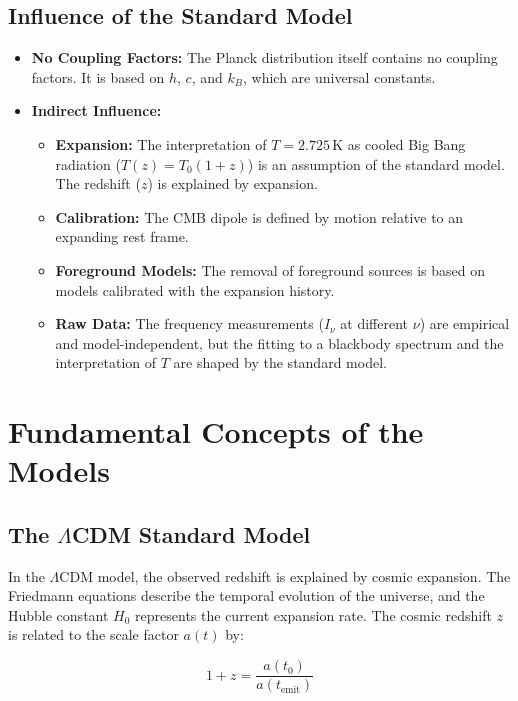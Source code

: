 \documentclass[a4paper,12pt]{article}
\theoremstyle{definition}
\theoremstyle{remark}
\begin{document}
	\subsection{Influence of the Standard Model}
	
	\begin{itemize}
		\item \textbf{No Coupling Factors:} The Planck distribution itself contains no coupling factors. It is based on $h$, $c$, and $k_B$, which are universal constants.
		\item \textbf{Indirect Influence:}
		\begin{itemize}
			\item \textbf{Expansion:} The interpretation of $T = 2.725 \, \text{K}$ as cooled Big Bang radiation ($T(z) = T_0 (1 + z)$) is an assumption of the standard model. The redshift ($z$) is explained by expansion.
			\item \textbf{Calibration:} The CMB dipole is defined by motion relative to an expanding rest frame.
			\item \textbf{Foreground Models:} The removal of foreground sources is based on models calibrated with the expansion history.
			\item \textbf{Raw Data:} The frequency measurements ($I_\nu$ at different $\nu$) are empirical and model-independent, but the fitting to a blackbody spectrum and the interpretation of $T$ are shaped by the standard model.
		\end{itemize}
	\end{itemize}
	
	\section{Fundamental Concepts of the Models}
	
	\subsection{The $\Lambda$CDM Standard Model}
	
	In the $\Lambda$CDM model, the observed redshift is explained by cosmic expansion. The Friedmann equations describe the temporal evolution of the universe, and the Hubble constant $H_0$ represents the current expansion rate. The cosmic redshift $z$ is related to the scale factor $a(t)$ by:
	
	\begin{equation}
		1 + z = \frac{a(t_0)}{a(t_{\text{emit}})}
	\end{equation}
	
\end{document}
